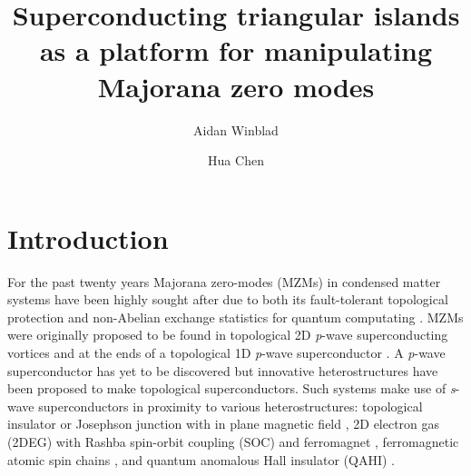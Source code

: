 \documentclass[aps,prb,showpacs,amsmath,amssymb,superscriptaddress]{revtex4-2}
\begin{document}
\title{Superconducting triangular islands as a platform for manipulating Majorana zero modes}

\author{Aidan Winblad}

\author{Hua Chen}

\maketitle



\section{Introduction}
For the past twenty years Majorana zero-modes (MZMs) in condensed matter systems have been highly sought after due to both its fault-tolerant topological protection and non-Abelian exchange statistics for quantum computating \cite{ivanovNonAbelianStatisticsHalfQuantum2001, kitaevFaulttolerantQuantumComputation2003, nayakNonAbelianAnyonsTopological2008, aliceaNonAbelianStatisticsTopological2011, aasenMilestonesMajoranaBasedQuantum2016}.
MZMs were originally proposed to be found in topological 2D \textit{p}-wave superconducting vortices and at the ends of a topological 1D \textit{p}-wave superconductor \cite{readPairedStatesFermions2000, kitaevUnpairedMajoranaFermions2001}.
A \textit{p}-wave superconductor has yet to be discovered but innovative heterostructures have been proposed to make topological superconductors.
Such systems make use of \textit{s}-wave superconductors in proximity to various heterostructures: topological insulator \cite{fuSuperconductingProximityEffect2008, hosurMajoranaModesEnds2011, potterEngineeringMathitipSuperconductor2011, veldhorstMagnetotransportInducedSuperconductivity2013} or Josephson junction with in plane magnetic field \cite{black-schafferMajoranaFermionsSpinorbitcoupled2011, pientkaSignaturesTopologicalPhase2013, hellTwoDimensionalPlatformNetworks2017, scharfTuningTopologicalSuperconductivity2019}, 2D electron gas (2DEG) with Rashba spin-orbit coupling (SOC) and ferromagnet \cite{oregHelicalLiquidsMajorana2010, sauGenericNewPlatform2010, lutchynSearchMajoranaFermions2011, potterTopologicalSuperconductivityMajorana2012, nadj-pergeProposalRealizingMajorana2013}, ferromagnetic atomic spin chains \cite{choyMajoranaFermionsEmerging2011, brauneckerInterplayClassicalMagnetic2013, klinovajaTopologicalSuperconductivityMajorana2013}, and quantum anomalous Hall insulator (QAHI) \cite{chenQuasionedimensionalQuantumAnomalous2018, zengQuantumAnomalousHall2018, xieCreatingLocalizedMajorana2021}.
\end{document}

